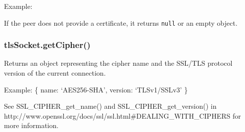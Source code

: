Example:

\begin{Shaded}
\begin{Highlighting}[]
\NormalTok{\{ }\NormalTok{:}
   \NormalTok{\{ }\NormalTok{: }\NormalTok{,}
     \NormalTok{: }\NormalTok{,}
     \NormalTok{: }\NormalTok{,}
     \NormalTok{: }\NormalTok{,}
     \NormalTok{: }\NormalTok{,}
     \NormalTok{: } \NormalTok{\},}
  \NormalTok{:}
   \NormalTok{\{ }\NormalTok{: }\NormalTok{,}
     \NormalTok{: }\NormalTok{,}
     \NormalTok{: }\NormalTok{,}
     \NormalTok{: }\NormalTok{,}
     \NormalTok{: }\NormalTok{,}
     \NormalTok{: } \NormalTok{\},}
  \NormalTok{:}
     
  \NormalTok{: }\NormalTok{,}
  \NormalTok{: }\NormalTok{,}
  \NormalTok{: }\NormalTok{,}
  \NormalTok{: } \NormalTok{\}}
\end{Highlighting}
\end{Shaded}

If the peer does not provide a certificate, it returns \texttt{null} or
an empty object.

\subsubsection{tlsSocket.getCipher()}\label{tlssocket.getcipher}

Returns an object representing the cipher name and the SSL/TLS protocol
version of the current connection.

Example: \{ name: `AES256-SHA', version: `TLSv1/SSLv3' \}

See SSL\_CIPHER\_get\_name() and SSL\_CIPHER\_get\_version() in
http://www.openssl.org/docs/ssl/ssl.html\#DEALING\_WITH\_CIPHERS for
more information.

